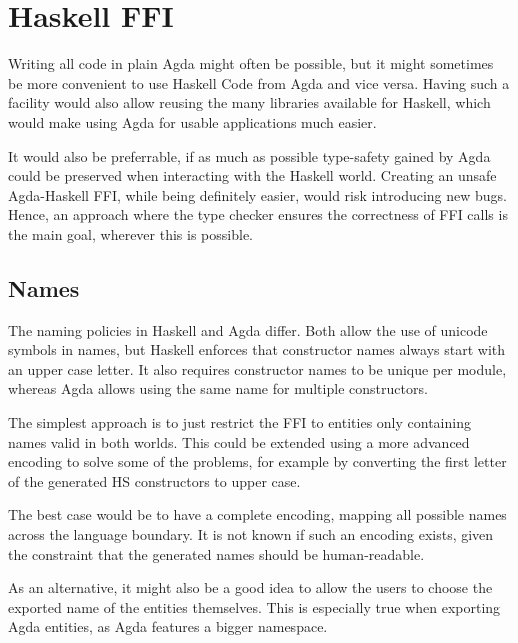 \documentclass[12pt, a4paper, twoside]{report}
\begin{document}
\section{Haskell FFI}
\label{sec:prop:hs-ffi}
Writing all code in plain Agda might often be possible, but it might sometimes be more
convenient to use Haskell Code from Agda and vice versa. Having such a facility would
also allow reusing the many libraries available for Haskell, which would make using Agda
for usable applications much easier.

It would also be preferrable, if as much as possible type-safety gained by Agda could be
preserved when interacting with the Haskell world. Creating an unsafe Agda-Haskell
FFI, while being definitely easier, would risk introducing new bugs. Hence, an approach
where the type checker ensures the correctness of FFI calls is the main goal, wherever
this is possible.


\subsection{Names}
The naming policies in Haskell and Agda differ. Both allow the use of unicode symbols in names, but Haskell enforces
that constructor names always start with an upper case letter. It also requires constructor names to be unique
per module, whereas Agda allows using the same name for multiple constructors.

The simplest approach is to just restrict the FFI to entities only containing names valid in both worlds.
This could be extended using a more advanced encoding to solve some of the problems, for example
by converting the first letter of the generated HS constructors to upper case.

The best case would be to have a complete encoding, mapping all possible names across the language boundary. It is not known
if such an encoding exists, given the constraint that the generated names should be human-readable.

As an alternative, it might also be a good idea to allow the users to choose the exported name of the entities themselves.
This is especially true when exporting Agda entities, as Agda features a bigger namespace.
\end{document}
